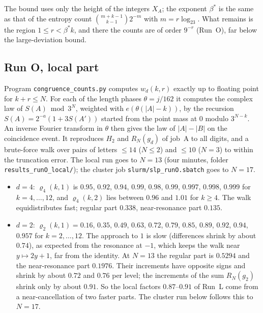 \documentclass[11pt]{article}
\theoremstyle{remark}
\begin{document}
The bound uses only the height of the integers $X_A$; the exponent $\beta^*$ is the same as that of the entropy count $\binom{m+k-1}{k-1}2^{-m}$ with $m=r\log_23$. What remains is the region $1\le r<\beta^*k$, and there the counts are of order $9^{-r}$ (Run~O), far below the large-deviation bound.

\subsection*{Run O, local part}
Program \texttt{congruence\_counts.py} computes $w_d(k,r)$ exactly up to floating point for $k+r\le N$. For each of the length phases $\theta=j/162$ it computes the complex law of $S(A)\bmod3^N$, weighted with $e(\theta(|A|-k))$, by the recursion $S(A)=2^{-a}(1+3S(A'))$ started from the point mass at $0$ modulo $3^{N-k}$. An inverse Fourier transform in $\theta$ then gives the law of $|A|-|B|$ on the coincidence event. It reproduces $H_2$ and $R_N(g_d)$ of job~A to all digits, and a brute-force walk over pairs of letters $\le14$ ($N\le2$) and $\le10$ ($N=3$) to within the truncation error. The local run goes to $N=13$ (four minutes, folder \texttt{results\_runO\_local/}); the cluster job \texttt{slurm/slp\_runO.sbatch} goes to $N=17$.
\begin{itemize}
\item $d=4$: $\varrho_4(k,1)$ is $0.95$, $0.92$, $0.94$, $0.99$, $0.98$, $0.99$, $0.997$, $0.998$, $0.999$ for $k=4,\dots,12$, and $\varrho_4(k,2)$ lies between $0.96$ and $1.01$ for $k\ge4$. The walk equidistributes fast; regular part $0.338$, near-resonance part $0.135$.
\item $d=2$: $\varrho_2(k,1)=0.16$, $0.35$, $0.49$, $0.63$, $0.72$, $0.79$, $0.85$, $0.89$, $0.92$, $0.94$, $0.957$ for $k=2,\dots,12$. The approach to $1$ is slow (differences shrink by about $0.74$), as expected from the resonance at $-1$, which keeps the walk near $y\mapsto2y+1$, far from the identity. At $N=13$ the regular part is $0.5294$ and the near-resonance part $0.1976$. Their increments have opposite signs and shrink by about $0.72$ and $0.76$ per level; the increments of the sum $R_N(g_2)$ shrink only by about $0.91$. So the local factors $0.87$--$0.91$ of Run~L come from a near-cancellation of two faster parts. The cluster run below follows this to $N=17$.
\end{itemize}
\end{document}
